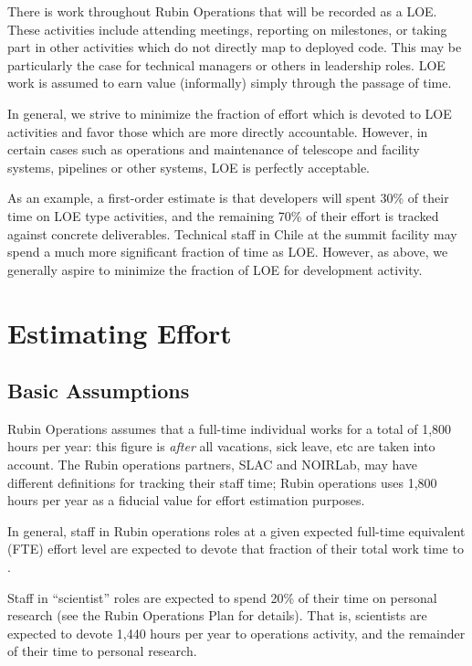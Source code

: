 There is work throughout Rubin Operations that will be recorded as a \gls{LOE}. 
These activities include attending meetings, reporting on milestones, or taking part in other activities which do not directly map to deployed code.
This may be particularly the case for technical managers or others in leadership roles.
\gls{LOE} work is assumed to earn value (informally) simply through the passage of time.

In general, we strive to minimize the fraction of effort which is devoted to \gls{LOE} activities and favor those which are more directly accountable.
However, in certain cases such as operations and maintenance of telescope and facility systems, pipelines or other systems, \gls{LOE} is perfectly acceptable.

As an example, a first-order estimate is that developers will spent 30\% of their time on \gls{LOE} type activities, and the remaining 70\% of their effort is tracked against concrete deliverables. 
Technical staff in Chile at the summit facility may spend a much more significant fraction of time as  \gls{LOE}.
However, as above, we generally aspire to minimize the fraction of \gls{LOE} for development activity.


\section{Estimating Effort}
\label{sec:effort}

\subsection{Basic Assumptions}
Rubin Operations assumes that a full-time individual works for a total of 1,800 hours per year: this figure is \emph{after} all vacations, sick leave, etc are taken into account.
The Rubin operations partners, SLAC and NOIRLab, may have different definitions for tracking their staff time; Rubin operations uses 1,800 hours per year as a fiducial value for effort estimation purposes.

In general, staff in Rubin operations roles at a given expected full-time equivalent (FTE) effort level are expected to devote that fraction of their total work time to \RO.

Staff in ``scientist'' roles are expected to spend 20\% of their time on personal research (see the Rubin Operations Plan for details).
That is, scientists are expected to devote 1,440 hours per
year to operations activity, and the remainder of their time to personal research.

